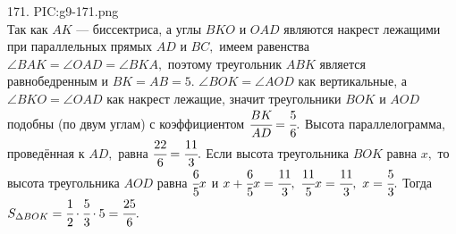 171. {{PIC:g9-171.png}}\\
Так как $AK$ --- биссектриса, а углы $BKO$ и $OAD$ являются накрест лежащими при параллельных прямых $AD$ и $BC,$ имеем равенства $\angle BAK=\angle OAD=\angle BKA,$ поэтому треугольник $ABK$ является равнобедренным и $BK=AB=5.$ $\angle BOK=\angle AOD$ как вертикальные, а $\angle BKO=\angle OAD$ как накрест лежащие, значит треугольники $BOK$ и $AOD$ подобны (по двум углам) с коэффициентом $\cfrac{BK}{AD}=\cfrac{5}{6}.$ Высота параллелограмма, проведённая к $AD,$ равна $\cfrac{22}{6}=\cfrac{11}{3}.$ Если высота треугольника $BOK$ равна $x,$ то высота треугольника $AOD$ равна $\cfrac{6}{5}x$ и $x+\cfrac{6}{5}x=\cfrac{11}{3},\ \cfrac{11}{5} x=\cfrac{11}{3},\ x=\cfrac{5}{3}.$ Тогда $S_{\Delta BOK}=\cfrac{1}{2}\cdot\cfrac{5}{3}\cdot5=\cfrac{25}{6}.$\\
